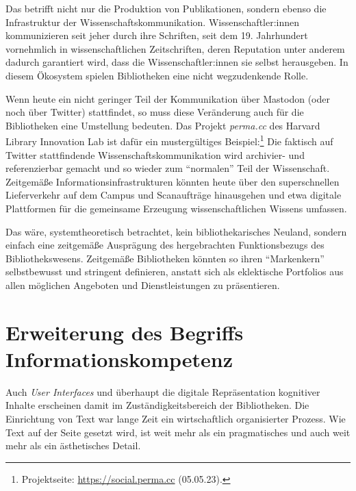 \documentclass[a4paper,
fontsize=11pt,
oneside,
numbers=noperiodatend,
parskip=half-,
bibliography=totoc,
final
]{scrartcl}
\begin{document}
Das betrifft nicht nur die Produktion von Publikationen, sondern ebenso
die Infrastruktur der Wissenschaftskommunikation. Wissenschaftler:innen
kommunizieren seit jeher durch ihre Schriften, seit dem 19. Jahrhundert
vornehmlich in wissenschaftlichen Zeitschriften, deren Reputation unter
anderem dadurch garantiert wird, dass die Wissenschaftler:innen sie
selbst herausgeben. In diesem Ökosystem spielen Bibliotheken eine nicht
wegzudenkende Rolle.

Wenn heute ein nicht geringer Teil der Kommunikation über Mastodon (oder
noch über Twitter) stattfindet, so muss diese Veränderung auch für die
Bibliotheken eine Umstellung bedeuten. Das Projekt \emph{perma.cc} des
Harvard Library Innovation Lab ist dafür ein mustergültiges
Beispiel:\footnote{Projektseite: \url{https://social.perma.cc}
  (05.05.23).} Die faktisch auf Twitter stattfindende
Wissenschaftskommunikation wird archivier- und referenzierbar gemacht
und so wieder zum \enquote{normalen} Teil der Wissenschaft. Zeitgemäße
Informationsinfrastrukturen könnten heute über den superschnellen
Lieferverkehr auf dem Campus und Scanaufträge hinausgehen und etwa
digitale Plattformen für die gemeinsame Erzeugung wissenschaftlichen
Wissens umfassen.

Das wäre, systemtheoretisch betrachtet, kein bibliothekarisches Neuland,
sondern einfach eine zeitgemäße Ausprägung des hergebrachten
Funktionsbezugs des Bibliothekswesens. Zeitgemäße Bibliotheken könnten
so ihren \enquote{Markenkern} selbstbewusst und stringent definieren,
anstatt sich als eklektische Portfolios aus allen möglichen Angeboten
und Dienstleistungen zu präsentieren.

\hypertarget{erweiterung-des-begriffs-informationskompetenz}{%
\section{Erweiterung des Begriffs
Informationskompetenz}\label{erweiterung-des-begriffs-informationskompetenz}}

Auch \emph{User Interfaces} und überhaupt die digitale Repräsentation
kognitiver Inhalte erscheinen damit im Zuständigkeitsbereich der
Bibliotheken. Die Einrichtung von Text war lange Zeit ein wirtschaftlich
organisierter Prozess. Wie Text auf der Seite gesetzt wird, ist weit
mehr als ein pragmatisches und auch weit mehr als ein ästhetisches
Detail.
\end{document}
